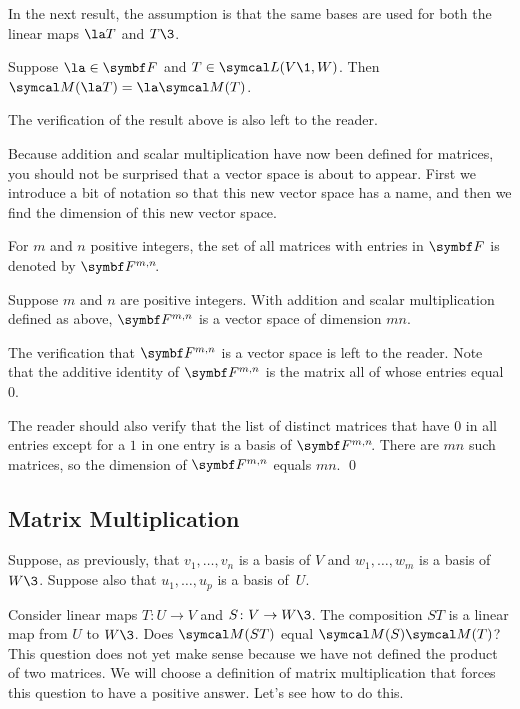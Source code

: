 In the next result, the assumption is that the same bases are used for both the linear maps $\la T$ and $T\3$.

{Suppose $\la \in \F{}$ and $T \in \L(V\1, W)$. Then $\M(\la T) = \la \M(T)$.}

The verification of the result above is also left to the reader.

Because addition and scalar multiplication have now been defined for matrices, you should not be surprised that a vector space is about to appear.  First we introduce a bit of notation so that this new vector space has a name, and then we find the dimension of this new vector space.

{\label{3mnmatrices}For $m$ and $n$ positive integers, the set of all
 matrices with entries in $\F{}$ is denoted by
$\FF{m,n}$.}

{Suppose $m$ and $n$ are positive integers. With addition and scalar multiplication defined as above, $\F{m,n}$ is a vector space of dimension $mn$.}

\proof
The verification that $\F{m,n}$ is a vector space is left to the reader.
Note that the additive  identity of $\F{m,n}$ is the  matrix all of whose entries equal~$0$.

The reader should also verify that the list of distinct  matrices
that have $0$ in all entries except for a $1$ in one entry is a basis of $\FF{m,n}$.  There are $mn$ such
matrices, so the dimension of $\F{m,n}$ equals $mn$. \qed

\subsection{Matrix Multiplication}

Suppose, as previously, that $v_1, \dots, v_n$ is a basis of $V$ and $w_1, \dots, w_m$ is a basis of~$W\3$.  Suppose also that
$u_1, \dots, u_p$ is a basis of~$U$.

Consider linear maps $T\colon U  \rightarrow V$
and $S\colon V \rightarrow W\3$.  The composition $ST$ is a linear map from $U$
to $W\3$.  Does $\M(ST)$ equal $\M(S) \M(T)$? This question does not yet make sense because
we have not defined the product of two matrices. We will choose a definition of matrix multiplication that forces this question to have a positive answer.  Let's see how to do this.

